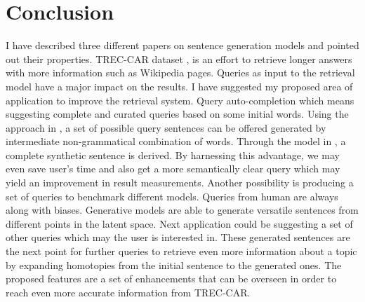 \documentclass[letterpaper,12pt]{article}
\begin{document}
\section{Conclusion}
I have described three different papers on sentence generation models and pointed out their properties. TREC-CAR dataset \cite{dietz}, is an effort to retrieve longer answers with more information such as Wikipedia pages. Queries as input to the retrieval model have a major impact on the results. I have suggested my proposed area of application to improve the retrieval system. Query auto-completion which means suggesting complete and curated queries based on some initial words. Using the approach in \cite{Bowman2015GeneratingSpace}, a set of possible query sentences can be offered generated by intermediate non-grammatical combination of words. Through the model in \cite{Bowman2015GeneratingSpace}, a complete synthetic sentence is derived. By harnessing this advantage, we may even save user's time and also get a more semantically clear query which may yield an improvement in result measurements. Another possibility is producing a set of queries to benchmark different models. Queries from human are always along with biases. Generative models are able to generate versatile sentences from different points in the latent space. Next application could be suggesting a set of other queries which may the user is interested in. These generated sentences are the next point for further queries to retrieve even more information about a topic by expanding homotopies from the initial sentence to the generated ones. The proposed features are a set of enhancements that can be overseen in order to reach even more accurate information from TREC-CAR.




\end{document}
